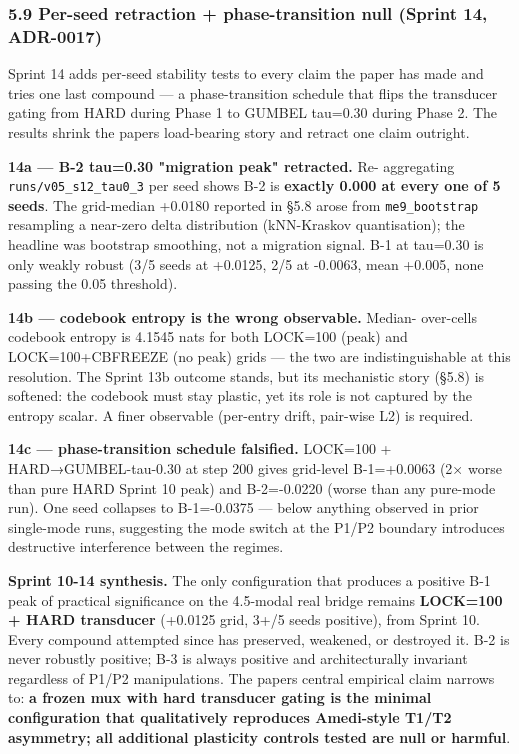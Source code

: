 \documentclass[
]{article}
\newcounter{none} %
\begin{document}
\subsubsection{5.9 Per-seed retraction + phase-transition null (Sprint
14,
ADR-0017)}\label{59-per-seed-retraction--phase-transition-null-sprint-14-adr-0017}

Sprint 14 adds per-seed stability tests to every claim the paper has
made and tries one last compound --- a phase-transition schedule that
flips the transducer gating from HARD during Phase 1 to GUMBEL tau=0.30
during Phase 2. The results shrink the paper\textquotesingle s
load-bearing story and retract one claim outright.

\textbf{14a --- B-2 tau=0.30 "migration peak" retracted.} Re-
aggregating \texttt{runs/v05\_s12\_tau0\_3} per seed shows B-2 is
\textbf{exactly 0.000 at every one of 5 seeds}. The grid-median +0.0180
reported in §5.8 arose from \texttt{me9\_bootstrap} resampling a
near-zero delta distribution (kNN-Kraskov quantisation); the headline
was bootstrap smoothing, not a migration signal. B-1 at tau=0.30 is only
weakly robust (3/5 seeds at +0.0125, 2/5 at -0.0063, mean +0.005, none
passing the 0.05 threshold).

\textbf{14b --- codebook entropy is the wrong observable.} Median-
over-cells codebook entropy is 4.1545 nats for both LOCK=100 (peak) and
LOCK=100+CBFREEZE (no peak) grids --- the two are indistinguishable at
this resolution. The Sprint 13b outcome stands, but its mechanistic
story (§5.8) is softened: the codebook must stay plastic, yet its role
is not captured by the entropy scalar. A finer observable (per-entry
drift, pair-wise L2) is required.

\textbf{14c --- phase-transition schedule falsified.} LOCK=100 +
HARD→GUMBEL-tau-0.30 at step 200 gives grid-level B-1=+0.0063 (2× worse
than pure HARD Sprint 10 peak) and B-2=-0.0220 (worse than any pure-mode
run). One seed collapses to B-1=-0.0375 --- below anything observed in
prior single-mode runs, suggesting the mode switch at the P1/P2 boundary
introduces destructive interference between the regimes.

\textbf{Sprint 10-14 synthesis.} The only configuration that produces a
positive B-1 peak of practical significance on the 4.5-modal real bridge
remains \textbf{LOCK=100 + HARD transducer} (+0.0125 grid, 3+/5 seeds
positive), from Sprint 10. Every compound attempted since has preserved,
weakened, or destroyed it. B-2 is never robustly positive; B-3 is always
positive and architecturally invariant regardless of P1/P2
manipulations. The paper\textquotesingle s central empirical claim
narrows to: \textbf{a frozen mux with hard transducer gating is the
minimal configuration that qualitatively reproduces Amedi-style T1/T2
asymmetry; all additional plasticity controls tested are null or
harmful}.
\end{document}
